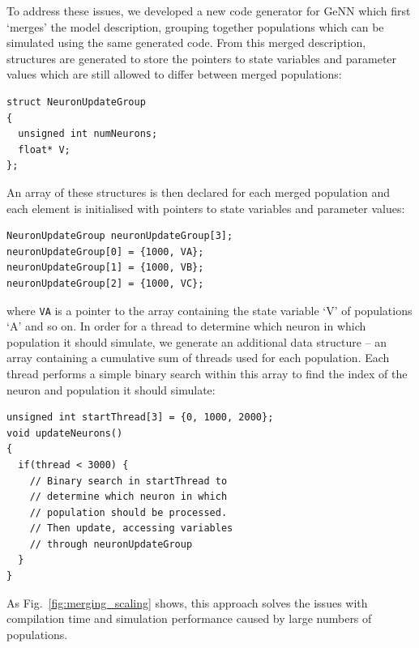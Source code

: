 \documentclass[9pt,twocolumn,twoside,lineno]{pnas-new}
\begin{document}
To address these issues, we developed a new code generator for GeNN which first `merges' the model description, grouping together populations which can be simulated using the same generated code.
From this merged description, structures are generated to store the pointers to state variables and parameter values which are still allowed to differ between merged populations:
%
\begin{lstlisting}
struct NeuronUpdateGroup
{
  unsigned int numNeurons;
  float* V;  
};
\end{lstlisting}
%
An array of these structures is then declared for each merged population and each element is initialised with pointers to state variables and parameter values:
%
\begin{lstlisting}
NeuronUpdateGroup neuronUpdateGroup[3];
neuronUpdateGroup[0] = {1000, VA};
neuronUpdateGroup[1] = {1000, VB};
neuronUpdateGroup[2] = {1000, VC};
\end{lstlisting}
%
where \lstinline{VA} is a pointer to the array containing the state variable `V' of populations `A' and so on.
In order for a thread to determine which neuron in which population it should simulate, we generate an additional data structure -- an array containing a cumulative sum of threads used for each population.
Each thread performs a simple binary search within this array to find the index of the neuron and population it should simulate:
%
\begin{lstlisting}
unsigned int startThread[3] = {0, 1000, 2000};
void updateNeurons()
{
  if(thread < 3000) {
    // Binary search in startThread to 
    // determine which neuron in which 
    // population should be processed. 
    // Then update, accessing variables 
    // through neuronUpdateGroup
  }
}
\end{lstlisting}
%
As Fig.~\ref{fig:merging_scaling} shows, this approach solves the issues with compilation time and simulation performance caused by large numbers of populations.
\end{document}
